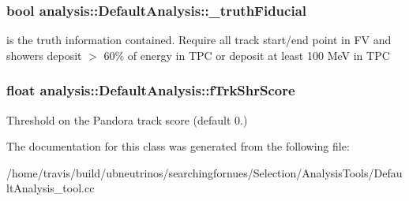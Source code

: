 \subsubsection[{\texorpdfstring{\+\_\+truth\+Fiducial}{_truthFiducial}}]{\setlength{\rightskip}{0pt plus 5cm}bool analysis\+::\+Default\+Analysis\+::\+\_\+truth\+Fiducial\hspace{0.3cm}{\ttfamily [private]}}\hypertarget{classanalysis_1_1DefaultAnalysis_afeaae35ab7febd51709747d19042838b}{}\label{classanalysis_1_1DefaultAnalysis_afeaae35ab7febd51709747d19042838b}
is the truth information contained. Require all track start/end point in FV and showers deposit $>$ 60\% of energy in T\+PC or deposit at least 100 MeV in T\+PC 
\subsubsection[{\texorpdfstring{f\+Trk\+Shr\+Score}{fTrkShrScore}}]{\setlength{\rightskip}{0pt plus 5cm}float analysis\+::\+Default\+Analysis\+::f\+Trk\+Shr\+Score\hspace{0.3cm}{\ttfamily [private]}}\hypertarget{classanalysis_1_1DefaultAnalysis_aba718fab9e0072c6a046b9f9aa3670bf}{}\label{classanalysis_1_1DefaultAnalysis_aba718fab9e0072c6a046b9f9aa3670bf}
Threshold on the Pandora track score (default 0.) 

The documentation for this class was generated from the following file\+:\begin{DoxyCompactItemize}
\item 
/home/travis/build/ubneutrinos/searchingfornues/\+Selection/\+Analysis\+Tools/Default\+Analysis\+\_\+tool.\+cc\end{DoxyCompactItemize}
